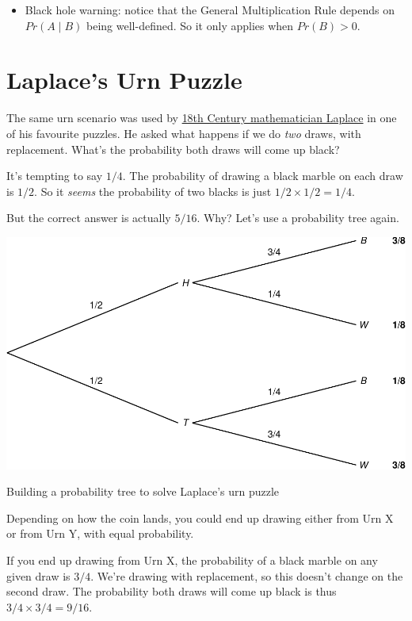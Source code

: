 \documentclass[justified]{tufte-book}
\newcommand{\given}{\mid}
\newcommand{\gt}{>}
\newcommand{\p}{Pr}
\newenvironment{warning}{\begin{itemize}\item[\faBan]}{\end{itemize}}
\theoremstyle{definition}
\theoremstyle{definition}
\theoremstyle{definition}
\theoremstyle{definition}
\theoremstyle{remark}
\begin{document}
\begin{warning}
Black hole warning: notice that the General Multiplication Rule depends
on \(\p(A \given B)\) being well-defined. So it only applies when
\(\p(B) \gt 0\).
\end{warning}

\hypertarget{laplaces-urn-puzzle}{%
\section{Laplace's Urn Puzzle}\label{laplaces-urn-puzzle}}

The same urn scenario was used by \protect\hyperlink{strength}{18th Century mathematician Laplace} in one of his favourite puzzles. He asked what happens if we do \emph{two} draws, with replacement. What's the probability both draws will come up black?

It's tempting to say \(1/4\). The probability of drawing a black marble on each draw is \(1/2\). So it \emph{seems} the probability of two blacks is just \(1/2 \times 1/2 = 1/4\).

But the correct answer is actually \(5/16\). Why? Let's use a probability tree again.

\begin{marginfigure}
\includegraphics{_main_files/figure-latex/unnamed-chunk-63-1} \caption[Building a probability tree to solve Laplace's urn puzzle]{Building a probability tree to solve Laplace's urn puzzle}\label{fig:unnamed-chunk-63}
\end{marginfigure}

Depending on how the coin lands, you could end up drawing either from Urn X or from Urn Y, with equal probability.

If you end up drawing from Urn X, the probability of a black marble on any given draw is \(3/4\). We're drawing with replacement, so this doesn't change on the second draw. The probability both draws will come up black is thus \(3/4 \times 3/4 = 9/16\).
\end{document}
